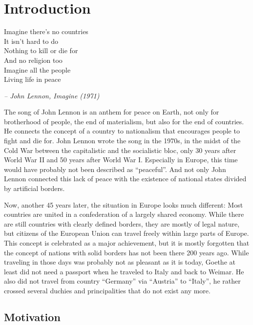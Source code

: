 
\chapter{Introduction} %
\label{cha:introduction}
\begin{large}
\begin{quoteit}
  Imagine there's no countries \\
  It isn't hard to do \\
  Nothing to kill or die for \\
  And no religion too \\
  Imagine all the people \\
  Living life in peace
\end{quoteit}
\end{large}
\hfill \textit{-- John Lennon, \emph{Imagine} (1971)}

The song of John Lennon is an anthem for peace on Earth, not only for brotherhood of people, the end of materialism, but also for the end of countries. He connects the concept of a country to nationalism that encourages people to fight and die for. John Lennon wrote the song in the 1970s, in the midst of the Cold War between the capitalistic and the socialistic bloc, only 30 years after World War II and 50 years after World War I. Especially in Europe, this time would have probably not been described as ``peaceful''. And not only John Lennon connected this lack of peace with the existence of national states divided by artificial borders.

Now, another 45 years later, the situation in Europe looks much different: Most countries are united in a confederation of a largely shared economy. While there are still countries with clearly defined borders, they are mostly of legal nature, but citizens of the European Union can travel freely within large parts of Europe. This concept is celebrated as a major achievement, but it is mostly forgotten that the concept of nations with solid borders has not been there 200 years ago. While traveling in those days was probably not as pleasant as it is today, Goethe at least did not need a passport when he traveled to Italy and back to Weimar. He also did not travel from country ``Germany'' via ``Austria'' to ``Italy'', he rather crossed several duchies and principalities that do not exist any more.

\section{Motivation} %
\label{sec:motivation}

